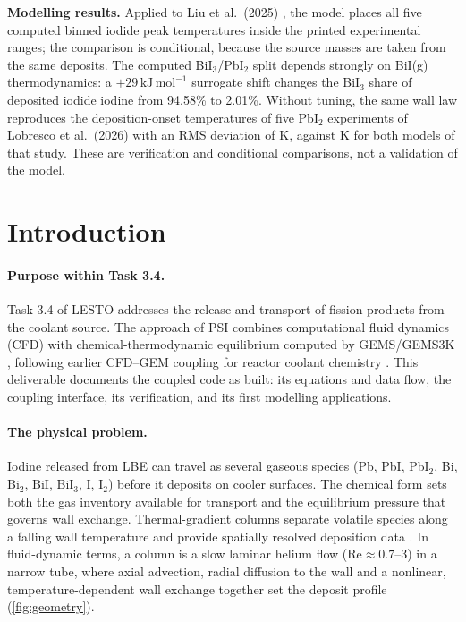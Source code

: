 \documentclass[11pt,a4paper]{article}
\newcommand{\units}[1]{\,\mathrm{#1}}
\begin{document}
\textbf{Modelling results.} Applied to Liu et al.\ (2025)
\cite{Liu2025chemical}, the model places all five computed binned iodide
peak temperatures inside the printed experimental ranges; the comparison
is conditional, because the source masses are taken from the same
deposits. The computed BiI$_3$/PbI$_2$ split depends strongly on BiI(g)
thermodynamics: a $+29\units{kJ\,mol^{-1}}$ surrogate shift changes the
BiI$_3$ share of deposited iodide iodine from 94.58\% to 2.01\%. Without
tuning, the same wall law reproduces the deposition-onset temperatures
of five PbI$_2$ experiments of Lobresco et al.\ (2026)
\cite{Lobresco2026assessment} with an RMS deviation of \LobRMS{} K,
against \LobRMSTemp{} K for both models of that study. These are
verification and conditional comparisons, not a validation of the
model.

\setcounter{tocdepth}{1}
\tableofcontents

\section{Introduction}
\label{sec:intro}

\paragraph{Purpose within Task 3.4.} Task 3.4 of LESTO addresses the
release and transport of fission products from the coolant source. The
approach of PSI combines computational fluid dynamics (CFD) with
chemical-thermodynamic equilibrium computed by GEMS/GEMS3K
\cite{Kulik2013gemselektor,Wagner2012gemselektor}, following earlier
CFD--GEM coupling for reactor coolant chemistry
\cite{Marino2020multiphysics}. This deliverable documents the coupled
code as built: its equations and data flow, the coupling interface, its
verification, and its first modelling applications.

\paragraph{The physical problem.} Iodine released from LBE can travel as
several gaseous species (Pb, PbI, PbI$_2$, Bi, Bi$_2$, BiI, BiI$_3$,
I, I$_2$) before it deposits on cooler surfaces. The chemical form sets
both the gas inventory available for transport and the equilibrium
pressure that governs wall exchange. Thermal-gradient columns separate
volatile species along a falling wall temperature and provide spatially
resolved deposition data \cite{Liu2025chemical,Lobresco2026assessment,
Eichler1975verfluchtigung,Zvara2008inorganic}. In fluid-dynamic terms,
a column is a slow laminar helium flow ($\mathrm{Re}\approx0.7$--3) in a
narrow tube, where axial advection, radial diffusion to the wall and a
nonlinear, temperature-dependent wall exchange together set the deposit
profile (\cref{fig:geometry}).
\end{document}
